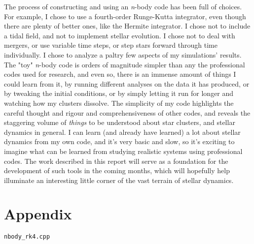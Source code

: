 \documentclass{article}
\begin{document}
The process of constructing and using an \textit{n}-body code has been full of choices. For example, I chose to use a fourth-order Runge-Kutta integrator, even though there are plenty of better ones, like the Hermite integrator. I chose not to include a tidal field, and not to implement stellar evolution. I chose not to deal with mergers, or use variable time steps, or step stars forward through time individually. I chose to analyze a paltry few aspects of my simulations' results. The "toy" \textit{n}-body code is orders of magnitude simpler than any the professional codes used for research, and even so, there is an immense amount of things I could learn from it, by running different analyses on the data it has produced, or by tweaking the initial conditions, or by simply letting it run for longer and watching how my clusters dissolve. The simplicity of my code highlights the careful thought and rigour and comprehensiveness of other codes, and reveals the staggering volume of \textit{things} to be understood about star clusters, and stellar dynamics in general. I can learn (and already have learned) a lot about stellar dynamics from my own code, and it's very basic and slow, so it's exciting to imagine what can be learned from studying realistic systems using professional codes. The work described in this report will serve as a foundation for the development of such tools in the coming months, which will hopefully help illuminate an interesting little corner of the vast terrain of stellar dynamics.



\newpage
\section{Appendix}
\colorbox{g}{\lstinline[basicstyle=\ttfamily\footnotesize\color{black}]|nbody_rk4.cpp|}
\end{document}
